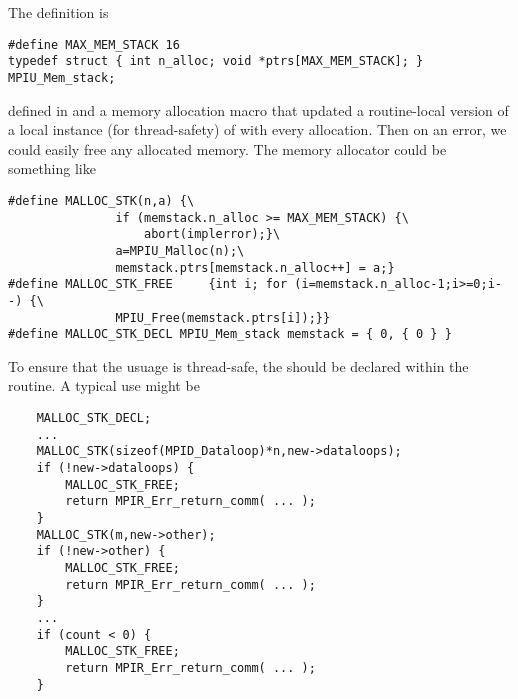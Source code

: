\documentclass{article}
\begin{document}
The definition is 
\begin{verbatim}
#define MAX_MEM_STACK 16
typedef struct { int n_alloc; void *ptrs[MAX_MEM_STACK]; } MPIU_Mem_stack;
\end{verbatim}
defined in  
and a memory allocation macro that updated a routine-local version of a
local instance (for thread-safety) of  
with every allocation.  Then on an error, we could easily free any allocated
memory.  The memory allocator could be something like
\begin{verbatim}
#define MALLOC_STK(n,a) {\
               if (memstack.n_alloc >= MAX_MEM_STACK) {\
                   abort(implerror);}\
               a=MPIU_Malloc(n);\
               memstack.ptrs[memstack.n_alloc++] = a;}
#define MALLOC_STK_FREE     {int i; for (i=memstack.n_alloc-1;i>=0;i--) {\
               MPIU_Free(memstack.ptrs[i]);}}
#define MALLOC_STK_DECL MPIU_Mem_stack memstack = { 0, { 0 } }
\end{verbatim}


To ensure that the usuage is thread-safe, the \code{memstack} should be
declared within the routine.  A typical use might be
\begin{verbatim}
    MALLOC_STK_DECL;
    ...
    MALLOC_STK(sizeof(MPID_Dataloop)*n,new->dataloops);
    if (!new->dataloops) {
        MALLOC_STK_FREE;
        return MPIR_Err_return_comm( ... );
    }
    MALLOC_STK(m,new->other);
    if (!new->other) {
        MALLOC_STK_FREE;
        return MPIR_Err_return_comm( ... );
    }
    ...
    if (count < 0) {
        MALLOC_STK_FREE; 
        return MPIR_Err_return_comm( ... );
    }
\end{verbatim}
\end{document}
